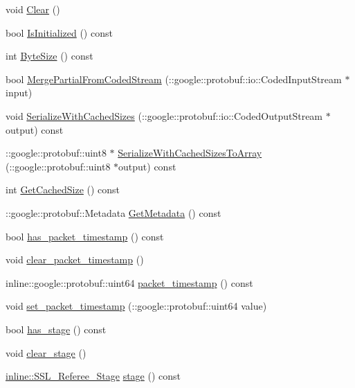 \begin{DoxyCompactItemize}
\item 
void \hyperlink{class_s_s_l___referee_a4c368f498bda074d139869327a0e7a3f}{Clear} ()
\item 
bool \hyperlink{class_s_s_l___referee_a00780b202ed1c9bb87c11c6e6cffb5f7}{Is\-Initialized} () const 
\item 
int \hyperlink{class_s_s_l___referee_acfed1cd4b608efe1d894359e76f9c300}{Byte\-Size} () const 
\item 
bool \hyperlink{class_s_s_l___referee_a8026fb76dfd5bf358c98ec7d3ec62cc3}{Merge\-Partial\-From\-Coded\-Stream} (\-::google\-::protobuf\-::io\-::\-Coded\-Input\-Stream $\ast$input)
\item 
void \hyperlink{class_s_s_l___referee_a8c9f942c7248a6934eae4e375922b5d5}{Serialize\-With\-Cached\-Sizes} (\-::google\-::protobuf\-::io\-::\-Coded\-Output\-Stream $\ast$output) const 
\item 
\-::google\-::protobuf\-::uint8 $\ast$ \hyperlink{class_s_s_l___referee_adef98e98525b8c773cf7a44d7d3d6216}{Serialize\-With\-Cached\-Sizes\-To\-Array} (\-::google\-::protobuf\-::uint8 $\ast$output) const 
\item 
int \hyperlink{class_s_s_l___referee_ab1597d5d54de3fca224d38fd05094754}{Get\-Cached\-Size} () const 
\item 
\-::google\-::protobuf\-::\-Metadata \hyperlink{class_s_s_l___referee_a7fd67eafe487be83ee0d19f2dc3bdfb3}{Get\-Metadata} () const 
\item 
bool \hyperlink{class_s_s_l___referee_aedc84ffc73a3ff10d303df650d15b777}{has\-\_\-packet\-\_\-timestamp} () const 
\item 
void \hyperlink{class_s_s_l___referee_a8e29343c07adb22ea7cf72bd126698bc}{clear\-\_\-packet\-\_\-timestamp} ()
\item 
inline\-::google\-::protobuf\-::uint64 \hyperlink{class_s_s_l___referee_acde0ec36a3bf64c838a3eadaaf4b7c04}{packet\-\_\-timestamp} () const 
\item 
void \hyperlink{class_s_s_l___referee_a4cabf46ae36ba81a3c5226edf3fb60f2}{set\-\_\-packet\-\_\-timestamp} (\-::google\-::protobuf\-::uint64 value)
\item 
bool \hyperlink{class_s_s_l___referee_a56e301cba089c71715a8fe9675dd6e7f}{has\-\_\-stage} () const 
\item 
void \hyperlink{class_s_s_l___referee_ab29852cb28d74ee417dab76f4140891a}{clear\-\_\-stage} ()
\item 
\hyperlink{referee_8pb_8h_a38b80041d0259d508796c1bc7ab57c4c}{inline\-::\-S\-S\-L\-\_\-\-Referee\-\_\-\-Stage} \hyperlink{class_s_s_l___referee_a49d3a95ec7f92effbc8e474715bd351f}{stage} () const 

\end{DoxyCompactItemize}
